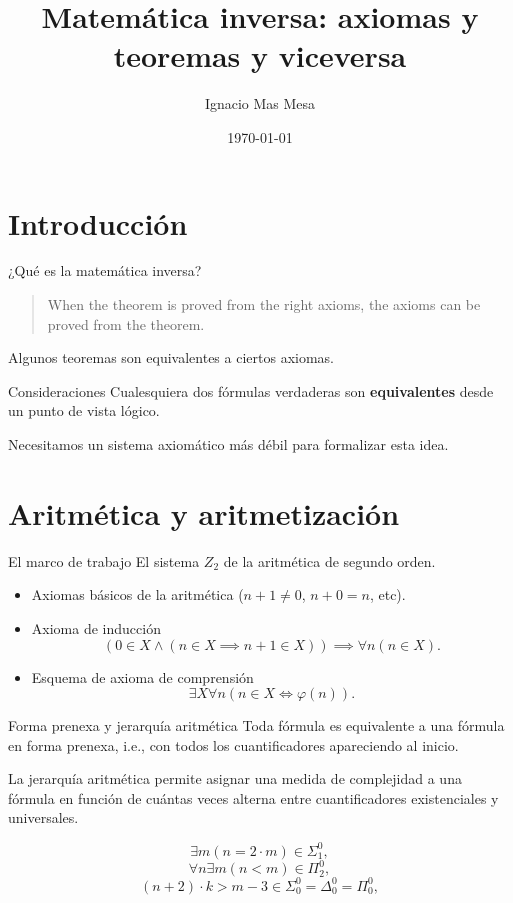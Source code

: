 \documentclass[10pt]{beamer}
\title{Matemática inversa: axiomas y teoremas y viceversa}
\date{\today}
\author{Ignacio Mas Mesa}
\institute{Universidad de Granada}
\begin{document}
\maketitle

\section{Introducción}

\begin{frame}[fragile]{¿Qué es la matemática inversa?}

  \begin{quote}
    When the theorem is proved from the right axioms, the axioms can be proved from the theorem.
  \end{quote}

  \vfill

  Algunos teoremas son equivalentes a ciertos axiomas.
\end{frame}

\begin{frame}[fragile]{Consideraciones}
  Cualesquiera dos fórmulas verdaderas son \textbf{equivalentes} desde un punto de vista lógico.

  \vfill

  Necesitamos un sistema axiomático más débil para formalizar esta idea.
\end{frame}

\section{Aritmética y aritmetización}

\begin{frame}[fragile]{El marco de trabajo}
  El sistema $Z_2$ de la aritmética de segundo orden.

  \begin{itemize}
  \item Axiomas básicos de la aritmética ($n + 1 \ne 0$, $n + 0 = n$, etc).
  \item Axioma de inducción
    \[ (0 \in X \land (n \in X \implies n + 1 \in X)) \implies \forall n (n \in X). \]
  \item Esquema de axioma de comprensión
    \[ \exists X \forall n (n \in X \iff \varphi(n)). \]
  \end{itemize}
\end{frame}

\begin{frame}[fragile]{Forma prenexa y jerarquía aritmética}
  Toda fórmula es equivalente a una fórmula en forma prenexa, i.e., con todos los cuantificadores apareciendo al inicio.

  La jerarquía aritmética permite asignar una medida de complejidad a una fórmula en función de cuántas veces alterna entre cuantificadores existenciales y universales.

  \[ \exists m (n = 2 \cdot m) \in \Sigma_1^0, \]
  \[ \forall n \exists m (n < m) \in \Pi_2^0, \]
  \[ (n + 2) \cdot k > m - 3  \in \Sigma_0^0 = \Delta_0^0 = \Pi_0^0, \]
\end{frame}
\end{document}
